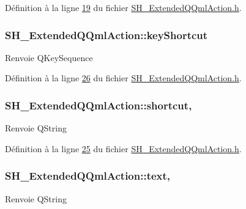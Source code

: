 Définition à la ligne \hyperlink{SH__ExtendedQQmlAction_8h_source_l00019}{19} du fichier \hyperlink{SH__ExtendedQQmlAction_8h_source}{S\-H\-\_\-\-Extended\-Q\-Qml\-Action.\-h}.

\hypertarget{classSH__ExtendedQQmlAction_ab7f341734bee947d1550d74bf560b413}{
\subsubsection[{key\-Shortcut}]{\setlength{\rightskip}{0pt plus 5cm}S\-H\-\_\-\-Extended\-Q\-Qml\-Action\-::key\-Shortcut\hspace{0.3cm}{\ttfamily [write]}}}\label{classSH__ExtendedQQmlAction_ab7f341734bee947d1550d74bf560b413}
\begin{DoxyReturn}{Renvoie}
Q\-Key\-Sequence 
\end{DoxyReturn}


Définition à la ligne \hyperlink{SH__ExtendedQQmlAction_8h_source_l00026}{26} du fichier \hyperlink{SH__ExtendedQQmlAction_8h_source}{S\-H\-\_\-\-Extended\-Q\-Qml\-Action.\-h}.

\hypertarget{classSH__ExtendedQQmlAction_a9a0a096f07b5e5a5b3387699daf0358d}{
\subsubsection[{shortcut}]{\setlength{\rightskip}{0pt plus 5cm}S\-H\-\_\-\-Extended\-Q\-Qml\-Action\-::shortcut\hspace{0.3cm}{\ttfamily [read]}, {\ttfamily [write]}}}\label{classSH__ExtendedQQmlAction_a9a0a096f07b5e5a5b3387699daf0358d}
\begin{DoxyReturn}{Renvoie}
Q\-String 
\end{DoxyReturn}


Définition à la ligne \hyperlink{SH__ExtendedQQmlAction_8h_source_l00025}{25} du fichier \hyperlink{SH__ExtendedQQmlAction_8h_source}{S\-H\-\_\-\-Extended\-Q\-Qml\-Action.\-h}.

\hypertarget{classSH__ExtendedQQmlAction_a7c10b09152a7e72f82e3a8c6251b6284}{
\subsubsection[{text}]{\setlength{\rightskip}{0pt plus 5cm}S\-H\-\_\-\-Extended\-Q\-Qml\-Action\-::text\hspace{0.3cm}{\ttfamily [read]}, {\ttfamily [write]}}}\label{classSH__ExtendedQQmlAction_a7c10b09152a7e72f82e3a8c6251b6284}
\begin{DoxyReturn}{Renvoie}
Q\-String 
\end{DoxyReturn}


